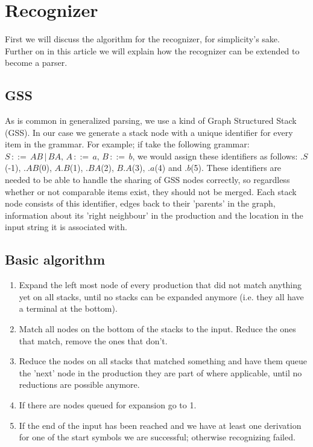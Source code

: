 \documentclass[a4paper,10pt]{article}
\begin{document}
\section{Recognizer}

First we will discuss the algorithm for the recognizer, for simplicity's sake. Further on in this article we will explain how the recognizer can be extended to become a parser.

\subsection{GSS}

As is common in generalized parsing, we use a kind of Graph Structured Stack (GSS). In our case we generate a stack node with a unique identifier for every item in the grammar. For example; if take the following grammar: $S\,::=\,AB\,|\,BA,\,A\,::=\,a,\,B\,::=\,b$, we would assign these identifiers as follows: $.S$(-1), $.AB$(0), $A.B$(1), $.BA$(2), $B.A$(3), $.a$(4) and $.b$(5). These identifiers are needed to be able to handle the sharing of GSS nodes correctly, so regardless whether or not comparable items exist, they should not be merged. Each stack node consists of this identifier, edges back to their 'parents' in the graph, information about its 'right neighbour' in the production and the location in the input string it is associated with.

\subsection{Basic algorithm}

\begin{enumerate}
 \setlength{\itemsep}{0pt}
 \setlength{\parskip}{0pt}
 \setlength{\parsep}{0pt}

 \item Expand the left most node of every production that did not match anything yet on all stacks, until no stacks can be expanded anymore (i.e. they all have a terminal at the bottom).
 \item Match all nodes on the bottom of the stacks to the input. Reduce the ones that match, remove the ones that don't.
 \item Reduce the nodes on all stacks that matched something and have them queue the 'next' node in the production they are part of where applicable, until no reductions are possible anymore.
 \item If there are nodes queued for expansion go to 1.
 \item If the end of the input has been reached and we have at least one derivation for one of the start symbols we are successful; otherwise recognizing failed.
\end{enumerate}
\end{document}
